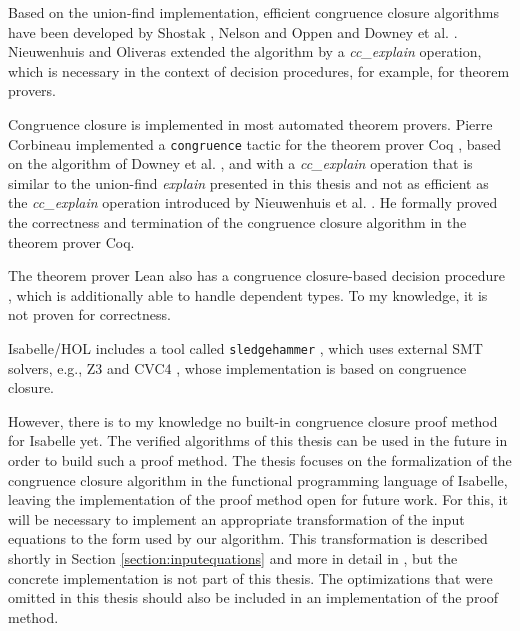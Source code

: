 Based on the union-find implementation, efficient congruence closure algorithms have been developed by Shostak \cite{congruenceclosure-og2}, Nelson and Oppen \cite{congruenceclosure-og} and Downey et al. \cite{congruenceclosure-og3}.
Nieuwenhuis and Oliveras \cite{Nieuwenhuis} extended the algorithm by a \emph{cc\_explain} operation, which is necessary in the context of decision procedures, for example, for theorem provers.

Congruence closure is implemented in most automated theorem provers. Pierre Corbineau implemented a \lstinline|congruence| tactic for the theorem prover Coq \cite{congruenceclosure-coq, congruence-coq}, based on the algorithm of Downey et al. \cite{congruenceclosure-og3}, and with a \emph{cc\_explain} operation that is similar to the union-find \emph{explain} presented in this thesis and not as efficient as the \emph{cc\_explain} operation introduced by Nieuwenhuis et al. \cite{Nieuwenhuis}. He formally proved the correctness and termination of the congruence closure algorithm in the theorem prover Coq.

The theorem prover Lean also has a congruence closure-based decision procedure \cite{congruenceclosure-lean}, which is additionally able to handle dependent types. To my knowledge, it is not proven for correctness.

Isabelle/HOL includes a tool called \lstinline|sledgehammer| \cite{sledgehammer}, which uses external SMT solvers, e.g., Z3 \cite{z3} and CVC4 \cite{cvc4}, whose implementation is based on congruence closure.

However, there is to my knowledge no built-in congruence closure proof method for Isabelle yet.
The verified algorithms of this thesis can be used in the future in order to build such a proof method.
The thesis focuses on the formalization of the congruence closure algorithm in the functional programming language of Isabelle, leaving the implementation of the proof method open for future work.
For this, it will be necessary to implement an appropriate transformation of the input equations to the form used by our algorithm.
This transformation is described shortly in Section \ref{section:inputequations} and more in detail in \cite{Nieuwenhuis}, but the concrete implementation is not part of this thesis.
The optimizations that were omitted in this thesis should also be included in an implementation of the proof method.
